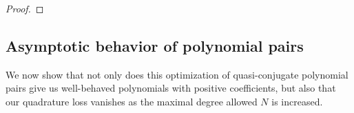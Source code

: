 \documentclass{article}
\theoremstyle{definition}
\theoremstyle{remark}
\numberwithin{equation}{section}
\begin{document}
\begin{proof}
\begin{comment}
Now consider the RHS. The denominator can be rewritten as 
\begin{align*} 
k \dbinom{N-1+p+k}{N}\dbinom{N}{k} &= N \dbinom{N-1+p+k}{N}\dbinom{N-1}{k-1} \\ 
&= (N+p+k-1) \dbinom{N+p+k-2}{N-1} \dbinom{N-1}{k-1} 
\end{align*} and plugging into the RHS and expanding gives 
\begin{align*}
&\frac{\sum_{j=1}^N (p+k+j-1) \dbinom{N+p+k-1}{N-j} \dbinom{N+p+j-1}{N-k} \dbinom{p+k+j-2}{k-1} \dbinom{p+k+j-2}{j-1} }{ (N+p+k-1) \dbinom{N+p+k-2}{N-1} \dbinom{N-1}{k-1} }  \\
&= \frac{ (N+p+k-1)\sum_{j=1}^N  \dbinom{N+p+k-2}{p+k+j-2} \dbinom{N+p+j-1}{N-k} \dbinom{p+k+j-2}{k-1} \dbinom{p+k+j-2}{j-1} }{ (N+p+k-1) \dbinom{N+p+k-2}{N-1} \dbinom{N-1}{k-1} }  \\
&= \frac{\sum_{j=1}^N \frac{(N+p+k-2)!}{(p+k+j-2)!(N-j)!} \frac{(N+p+j-1)!}{(N-k)! (p+j+k-1)!} \left(\frac{(p+k+j-2)!^2}{(k-1)! (p+j-1)!(j-1)!(p+k-1)!}\right)}{\frac{(N+p+k-2)!}{(N-1)! (p+k-1)!} \frac{(N-1)!}{(k-1)! (N-k)!}}
\\
&= \sum_{j=1}^N \frac{(N+p+j-1)! (p+k+j-2)!}{(N-j)!(p+j+k-1)!(p+j-1)!(j-1)!}\\
&= \sum_{j=1}^N \frac{(N+p+j-1)!N! j}{(p+j-1)!N!(N-j)!j! (p+j+k-1)}\\
&= \sum_{j=1}^N \dbinom{N+p+j-1}{N} \dbinom{N}{j} \frac{j}{p+j+k-1}
\end{align*} which is clearly monotonically decreasing in $k$, so it suffices to consider 
\begin{align*}
\sum_{j=1}^N \dbinom{N+p+j-1}{N} \dbinom{N}{j} \frac{j}{p+j+N-1} > \sum_{j=1}^N \dbinom{N+p+j-1}{N} \dbinom{N}{j}\frac{1}{p+N}
\end{align*} since the fraction $\frac{j}{p+j+N-1}$ is increasing in $j$ because both $j$ and $p+N-1$ positive.
\end{comment}
\end{proof}


\subsection{Asymptotic behavior of polynomial pairs}
We now show that not only does this optimization of quasi-conjugate polynomial pairs give us well-behaved polynomials with positive coefficients, but also that our quadrature loss vanishes as the maximal degree allowed $N$ is increased. 
\end{document}
